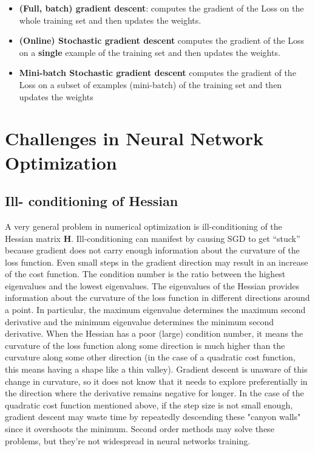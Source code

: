 \begin{itemize}
    \item \textbf{(Full, batch) gradient descent}: computes the gradient of the Loss on the whole training set and then updates the weights.

    \item \textbf{(Online) Stochastic gradient descent} computes the gradient of the Loss on a \textbf{single} example of the training set and then updates the weights.

    \item \textbf{Mini-batch Stochastic gradient descent} computes the gradient of the Loss on a subset of examples (mini-batch) of the training set and then updates the weights

\end{itemize}

\section{Challenges in Neural Network Optimization}

\subsection{Ill- conditioning of Hessian}
A very general problem in numerical optimization is ill-conditioning of the Hessian matrix $\textbf{H}$. Ill-conditioning can manifest by causing SGD to get “stuck” because gradient does not carry enough information about the curvature of the loss function. Even small steps in the gradient direction may result in an increase of the cost function.\newline\newline
The condition number is the ratio between the highest eigenvalues and the lowest eigenvalues. The eigenvalues of the Hessian provides information about the curvature of the loss function in different directions around a point. In particular, the maximum eigenvalue determines the maximum second
derivative and the minimum eigenvalue determines the minimum second derivative.
\newline\newline
When the Hessian has a poor (large) condition number, it means the curvature of the loss function along some direction is much higher than the curvature along some other direction (in the case of a quadratic cost function, this means having a shape like a thin valley).\newline\newline
Gradient descent is unaware of this change in curvature, so it does not know that it needs to explore preferentially in the direction where the derivative remains negative for longer.\newline\newline
In the case of the quadratic cost function mentioned above, if the step size is not small enough, gradient descent may waste time by repeatedly descending these "canyon walls" since it overshoots the minimum.\newline\newline
Second order methods may solve these problems, but they’re not widespread in neural networks training.

